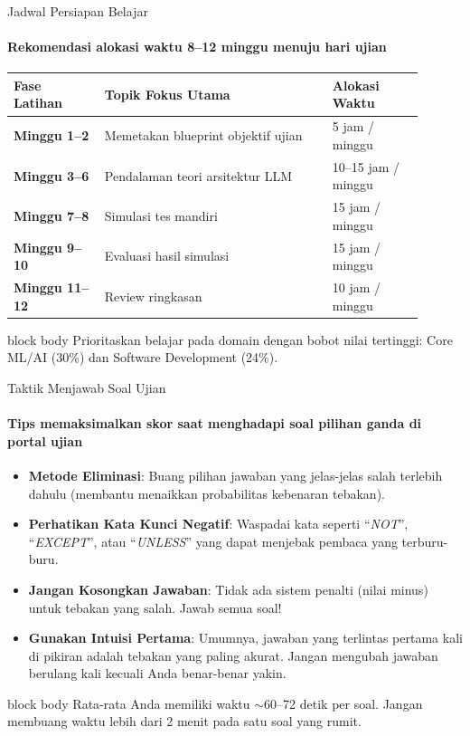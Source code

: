 \documentclass[aspectratio=169,t]{beamer}
\newcommand{\takeaway}[1]{%
  \vspace{0.1em}
  \begin{beamercolorbox}[rounded=true,shadow=false,sep=5pt]{block body}
    \centering\footnotesize\color{nvlightgreen}#1
  \end{beamercolorbox}%
}
\begin{document}
\begin{frame}{Jadwal Persiapan Belajar}
  \framesubtitle{Rekomendasi alokasi waktu 8--12 minggu menuju hari ujian}
  \begin{center}
  \renewcommand{\arraystretch}{1.2}{\footnotesize\setlength{\tabcolsep}{8pt}
  \begin{tabular}{@{}p{0.20\linewidth}p{0.50\linewidth}p{0.20\linewidth}@{}}
    \toprule \rowcolor{nvcard!50}
    \textbf{Fase Latihan} & \textbf{Topik Fokus Utama} & \textbf{Alokasi Waktu} \\ \midrule
    \textbf{Minggu 1--2} & Memetakan blueprint objektif ujian & 5 jam / minggu \\
    \textbf{Minggu 3--6} & Pendalaman teori arsitektur LLM & 10--15 jam / minggu \\
    \textbf{Minggu 7--8} & Simulasi tes mandiri & 15 jam / minggu \\
    \textbf{Minggu 9--10} & Evaluasi hasil simulasi & 15 jam / minggu \\
    \textbf{Minggu 11--12} & Review ringkasan & 10 jam / minggu \\
    \bottomrule
  \end{tabular}}
  \end{center}
  \takeaway{Prioritaskan belajar pada domain dengan bobot nilai tertinggi: Core ML/AI (30\%) dan Software Development (24\%).}
\end{frame}

\begin{frame}{Taktik Menjawab Soal Ujian}
  \framesubtitle{Tips memaksimalkan skor saat menghadapi soal pilihan ganda di portal ujian}
  \begin{itemize}\small
    \item \textbf{Metode Eliminasi}: Buang pilihan jawaban yang jelas-jelas salah terlebih dahulu (membantu menaikkan probabilitas kebenaran tebakan).
    \item \textbf{Perhatikan Kata Kunci Negatif}: Waspadai kata seperti ``\emph{NOT}'', ``\emph{EXCEPT}'', atau ``\emph{UNLESS}'' yang dapat menjebak pembaca yang terburu-buru.
    \item \textbf{Jangan Kosongkan Jawaban}: Tidak ada sistem penalti (nilai minus) untuk tebakan yang salah. Jawab semua soal!
    \item \textbf{Gunakan Intuisi Pertama}: Umumnya, jawaban yang terlintas pertama kali di pikiran adalah tebakan yang paling akurat. Jangan mengubah jawaban berulang kali kecuali Anda benar-benar yakin.
  \end{itemize}
  \takeaway{Rata-rata Anda memiliki waktu $\sim$60--72 detik per soal. Jangan membuang waktu lebih dari 2 menit pada satu soal yang rumit.}
\end{frame}
\end{document}
